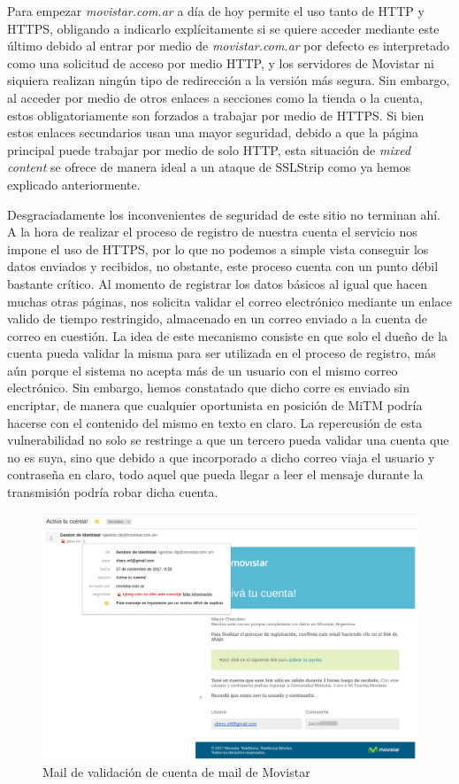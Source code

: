 \documentclass[10pt,a4paper]{article}
\begin{document}
Para empezar \textit{movistar.com.ar} a día de hoy permite el uso tanto de HTTP y HTTPS, obligando a indicarlo explícitamente si se quiere acceder mediante este último debido al entrar por medio de \textit{movistar.com.ar} por defecto es interpretado como una solicitud de acceso por medio HTTP, y los servidores de Movistar ni siquiera realizan ningún tipo de redirección a la versión más segura. Sin embargo, al acceder por medio de otros enlaces a secciones como la tienda o la cuenta, estos obligatoriamente son forzados a trabajar por medio de HTTPS. Si bien estos enlaces secundarios usan una mayor seguridad, debido a que la página principal puede trabajar por medio de solo HTTP, esta situación de \textit{mixed content} se ofrece de manera ideal a un ataque de SSLStrip como ya hemos explicado anteriormente.

Desgraciadamente los inconvenientes de seguridad de este sitio no terminan ahí. A la hora de realizar el proceso de registro de nuestra cuenta el servicio nos impone el uso de HTTPS, por lo que no podemos a simple vista conseguir los datos enviados y recibidos, no obstante, este proceso cuenta con un punto débil bastante crítico. Al momento de registrar los datos básicos al igual que hacen muchas otras páginas, nos solicita validar el correo electrónico mediante un enlace valido de tiempo restringido, almacenado en un correo enviado a la cuenta de correo en cuestión. La idea de este mecanismo consiste en que solo el dueño de la cuenta pueda validar la misma para ser utilizada en el proceso de registro, más aún porque el sistema no acepta más de un usuario con el mismo correo electrónico. Sin embargo, hemos constatado que dicho corre es enviado sin encriptar, de manera que cualquier oportunista en posición de MiTM podría hacerse con el contenido del mismo en texto en claro. La repercusión de esta vulnerabilidad no solo se restringe a que un tercero pueda validar una cuenta que no es suya, sino que debido a que incorporado a dicho correo viaja el usuario y contraseña en claro, todo aquel que pueda llegar a leer el mensaje durante la transmisión podría robar dicha cuenta.

\begin{figure}[H]
\centerline{\includegraphics[scale=0.4]{images/mail_movistar_cheru_v3.png}}
\caption{Mail de validación de cuenta de mail de Movistar}
\end{figure}
\end{document}
